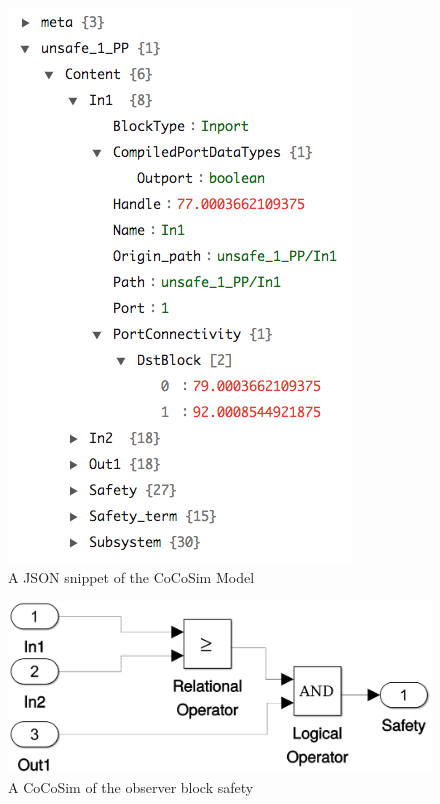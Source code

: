 \documentclass{article}
\begin{document}
\begin{figure}[h]
\begin{center}
  \includegraphics[scale=0.5]{figures/In1}
\end{center}  
  \caption{A JSON snippet of the CoCoSim Model}
  \label{jsoninport}
\end{figure}

\begin{figure}[h]
\begin{center}
  \includegraphics[scale=0.2]{figures/safety0}
\end{center}  
  \caption{A CoCoSim of the observer block safety}
  \label{cocosimsafety}
\end{figure}
\end{document}
